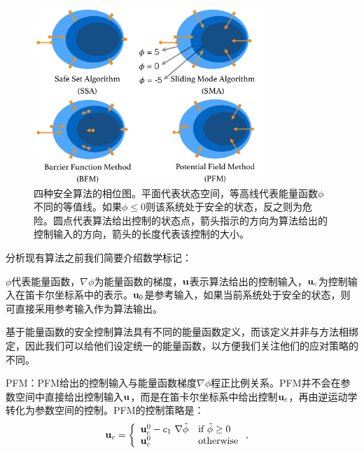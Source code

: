 \begin{figure}[h]
    \begin{center}
        \includegraphics[width=0.8\textwidth]{figure/phase.pdf}%
        \caption{四种安全算法的相位图。平面代表状态空间，等高线代表能量函数$\phi$不同的等值线。如果$\phi \leq 0$则该系统处于安全的状态，反之则为危险。圆点代表算法给出控制的状态点，箭头指示的方向为算法给出的控制输入的方向，箭头的长度代表该控制的大小。}
        \label{fig:safe_control}
    \end{center}
\end{figure}

分析现有算法之前我们简要介绍数学标记：

$\phi$代表能量函数，$\nabla \phi$为能量函数的梯度，$\mathbf{u}$表示算法给出的控制输入，$\mathbf{u}_c$为控制输入在笛卡尔坐标系中的表示。$\mathbf{u}_0$是参考输入，如果当前系统处于安全的状态，则可直接采用参考输入作为算法输出。

基于能量函数的安全控制算法具有不同的能量函数定义，而该定义并非与方法相绑定，因此我们可以给他们设定统一的能量函数，以方便我们关注他们的应对策略的不同。

PFM：PFM给出的控制输入与能量函数梯度$\nabla \phi$程正比例关系。PFM并不会在参数空间中直接给出控制输入$\mathbf{u}$，而是在笛卡尔坐标系中给出控制$\mathbf{u}_c$，再由逆运动学转化为参数空间的控制。PFM的控制策略是：
\begin{align}
    & \mathbf{u}_c = \left\{\begin{array}{ll}\mathbf{u}_c^0 - c_1\ \nabla \tilde\phi &\text{if } \tilde\phi \geq 0 \\
    \mathbf{u}_c^0 & \mathrm{otherwise}
    \end{array}\right. \label{eq: pfc},
\end{align}


